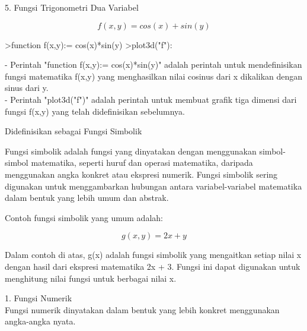 \documentclass[a4paper,10pt]{article}
\begin{document}
\begin{eulernotebook}
\begin{eulercomment}
\begin{eulercomment}
\begin{eulercomment}
\begin{eulercomment}
\begin{eulercomment}
\begin{eulercomment}
\begin{eulercomment}
\begin{eulercomment}
\begin{eulercomment}
\end{eulercomment}
\eulersubheading{}
\begin{eulercomment}
5. Fungsi Trigonometri Dua Variabel

\end{eulercomment}
\begin{eulerformula}
\[
f(x,y)=cos(x)+sin(y)
\]
\end{eulerformula}
\begin{eulerprompt}
>function f(x,y):= cos(x)*sin(y)
>plot3d("f"):
\end{eulerprompt}
\begin{eulercomment}
- Perintah "function f(x,y):= cos(x)*sin(y)" adalah perintah untuk
mendefinisikan fungsi matematika f(x,y) yang menghasilkan nilai
cosinus dari x dikalikan dengan sinus dari y.\\
- Perintah "plot3d("f")" adalah perintah untuk membuat grafik tiga
dimensi dari fungsi f(x,y) yang telah didefinisikan sebelumnya.



\end{eulercomment}
\begin{eulercomment}
Didefinisikan sebagai Fungsi Simbolik

\end{eulercomment}
\begin{eulercomment}
Fungsi simbolik adalah fungsi yang dinyatakan dengan menggunakan
simbol-simbol matematika, seperti huruf dan operasi matematika,
daripada menggunakan angka konkret atau ekspresi numerik. Fungsi
simbolik sering digunakan untuk menggambarkan hubungan antara
variabel-variabel matematika dalam bentuk yang lebih umum dan abstrak.

Contoh fungsi simbolik yang umum adalah:

\end{eulercomment}
\begin{eulerformula}
\[
g(x,y) = 2x + y
\]
\end{eulerformula}
\begin{eulercomment}
Dalam contoh di atas, g(x) adalah fungsi simbolik yang mengaitkan
setiap nilai x dengan hasil dari ekspresi matematika 2x + 3. Fungsi
ini dapat digunakan untuk menghitung nilai fungsi untuk berbagai nilai
x.

\end{eulercomment}
\begin{eulercomment}
1. Fungsi Numerik\\
Fungsi numerik dinyatakan dalam bentuk yang lebih konkret menggunakan
angka-angka nyata.


\end{eulercomment}
\end{eulercomment}
\end{eulercomment}
\end{eulercomment}
\end{eulercomment}
\end{eulercomment}
\end{eulercomment}
\end{eulercomment}
\end{eulercomment}
\end{eulernotebook}
\end{document}
